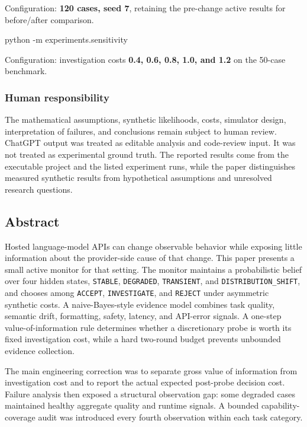 \documentclass[
]{article}
\newenvironment{Shaded}{}{}
\newcommand{\NormalTok}[1]{#1}
\begin{document}
Configuration: \textbf{120 cases, seed 7}, retaining the pre-change
active results for before/after comparison.

\begin{Shaded}
\begin{Highlighting}[]
\NormalTok{python {-}m experiments.sensitivity}
\end{Highlighting}
\end{Shaded}

Configuration: investigation costs \textbf{0.4, 0.6, 0.8, 1.0, and 1.2}
on the 50-case benchmark.

\subsubsection{Human responsibility}\label{human-responsibility}

The mathematical assumptions, synthetic likelihoods, costs, simulator
design, interpretation of failures, and conclusions remain subject to
human review. ChatGPT output was treated as editable analysis and
code-review input. It was not treated as experimental ground truth. The
reported results come from the executable project and the listed
experiment runs, while the paper distinguishes measured synthetic
results from hypothetical assumptions and unresolved research questions.

\subsection{Abstract}\label{abstract}

Hosted language-model APIs can change observable behavior while exposing
little information about the provider-side cause of that change. This
paper presents a small active monitor for that setting. The monitor
maintains a probabilistic belief over four hidden states,
\texttt{STABLE}, \texttt{DEGRADED}, \texttt{TRANSIENT}, and
\texttt{DISTRIBUTION\_SHIFT}, and chooses among \texttt{ACCEPT},
\texttt{INVESTIGATE}, and \texttt{REJECT} under asymmetric synthetic
costs. A naive-Bayes-style evidence model combines task quality,
semantic drift, formatting, safety, latency, and API-error signals. A
one-step value-of-information rule determines whether a discretionary
probe is worth its fixed investigation cost, while a hard two-round
budget prevents unbounded evidence collection.

The main engineering correction was to separate gross value of
information from investigation cost and to report the actual expected
post-probe decision cost. Failure analysis then exposed a structural
observation gap: some degraded cases maintained healthy aggregate
quality and runtime signals. A bounded capability-coverage audit was
introduced every fourth observation within each task category.
\end{document}
